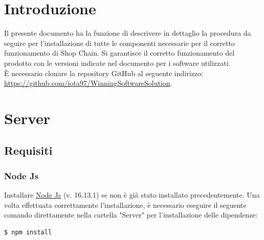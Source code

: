 \documentclass[a4paper, 12pt]{article}
\begin{document}
\makefrontpage

\makeversioni

\tableofcontents
\newpage

\section{Introduzione}
\label{sec:intro}
Il presente documento ha la funzione di descrivere in dettaglio la procedura da seguire per l'installazione di tutte le componenti necessarie per il corretto funzionamento di Shop Chain. Si garantisce il corretto funzionamento del prodotto con le versioni indicate nel documento per i software utilizzati.\\
È necessario clonare la repository GitHub al seguente indirizzo: \url{https://github.com/iota97/WinningSoftwareSolution}.\\

\newpage{}
\section{Server}
\subsection{Requisiti}
\subsubsection{Node Js}
Installare \href{https://nodejs.org/en/download/}{Node Js} (v. 16.13.1) se non è già stato installato precedentemente. Una volta effettuata correttamente l'installazione, è necessario eseguire il seguente comando direttamente nella cartella "Server" per l'installazione delle dipendenze:
\begin{lstlisting}[language=bash]
  $ npm install
\end{lstlisting}
\end{document}
